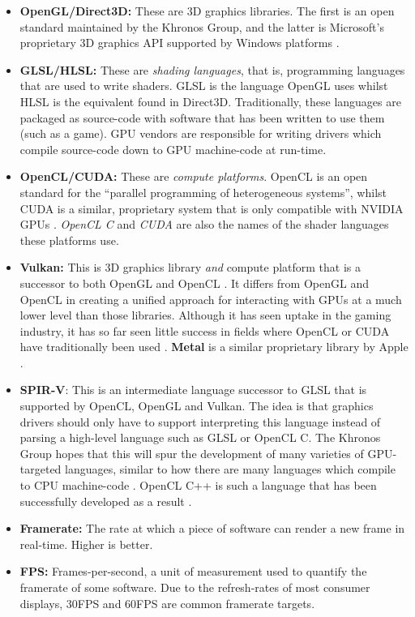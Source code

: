 \documentclass[a4paper,12pt,twoside,openright]{report}
\begin{document}
\begin{itemize}
    \item \textbf{OpenGL/Direct3D:} These are 3D graphics libraries. The first
    is an open standard maintained by the Khronos Group, and the
    latter is Microsoft's proprietary 3D graphics API supported by Windows
    platforms \cite{OpenGL} \cite{Direct3D}.

    \item \textbf{GLSL/HLSL:} These are \textit{shading languages}, that is,
    programming languages that are used to write shaders. GLSL is the language
    OpenGL uses whilst HLSL is the equivalent found in Direct3D. Traditionally,
    these languages are packaged as source-code with software that has been
    written to use them (such as a game). GPU vendors are responsible for
    writing drivers which compile source-code down to GPU machine-code at
    run-time.

    \item \textbf{OpenCL/CUDA:} These are \textit{compute platforms}. OpenCL is
    an open standard for the ``parallel programming of heterogeneous systems'',
    whilst CUDA is a similar, proprietary system that is only compatible with
    NVIDIA GPUs \cite{OpenCL} \cite{CUDA}. \textit{OpenCL C} and \textit{CUDA}
    are also the names of the shader languages these platforms use.

    \item \textbf{Vulkan:} This is 3D graphics library \textit{and} compute
    platform that is a successor to both OpenGL and OpenCL \cite{Vulkan}. It
    differs from OpenGL and OpenCL in creating a unified approach for
    interacting with GPUs at a much lower level than those libraries. Although
    it has seen uptake in the gaming industry, it has so far seen little
    success in fields where OpenCL or CUDA have traditionally been used
    \cite{TODO} \cite{TODO}. \textbf{Metal} is a similar proprietary library by
    Apple \cite{Metal}.

    \item \textbf{SPIR-V}: This is an intermediate language successor to GLSL
    that is supported by OpenCL, OpenGL and Vulkan. The idea is that graphics
    drivers should only have to support interpreting this language instead of
    parsing a high-level language such as GLSL or OpenCL C. The Khronos Group
    hopes that this will spur the development of many varieties of GPU-targeted
    languages, similar to how there are many languages which compile to CPU
    machine-code \cite{SPIRV}. OpenCL C++ is such a language that has been
    successfully developed as a result \cite{OpenCLCPPWhitePaper}.

    \item \textbf{Framerate:} The rate at which a piece of software can render
    a new frame in real-time. Higher is better.

    \item \textbf{FPS:} Frames-per-second, a unit of measurement used to
    quantify the framerate of some software. Due to the refresh-rates of most
    consumer displays, 30FPS and 60FPS are common framerate targets.

\end{itemize}
\end{document}
